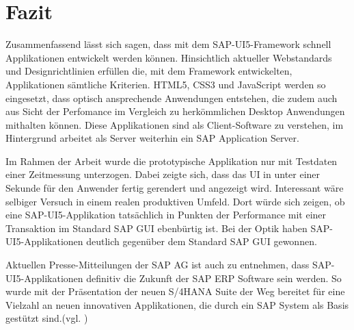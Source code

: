 \section{Fazit}\label{fazit}
Zusammenfassend lässt sich sagen, dass mit dem SAP-UI5-Framework schnell Applikationen entwickelt werden können. Hinsichtlich aktueller Webstandards und Designrichtlinien erfüllen die, mit dem Framework entwickelten, Applikationen sämtliche Kriterien. HTML5, CSS3 und JavaScript werden so eingesetzt, dass optisch ansprechende Anwendungen entstehen, die zudem auch aus Sicht der Perfomance im Vergleich zu herkömmlichen Desktop Anwendungen mithalten können. Diese Applikationen sind als Client-Software zu verstehen, im Hintergrund arbeitet als Server weiterhin ein SAP Application Server.\par Im Rahmen der Arbeit wurde die prototypische Applikation nur mit Testdaten einer Zeitmessung unterzogen. Dabei zeigte sich, dass das UI in unter einer Sekunde für den Anwender fertig gerendert und angezeigt wird. Interessant wäre selbiger Versuch in einem realen produktiven Umfeld. Dort würde sich zeigen, ob eine SAP-UI5-Applikation tatsächlich in Punkten der Performance mit einer Transaktion im Standard SAP GUI ebenbürtig ist. Bei der Optik haben SAP-UI5-Applikationen deutlich gegenüber dem Standard SAP GUI gewonnen.\par Aktuellen Presse-Mitteilungen der SAP AG ist auch zu entnehmen, dass SAP-UI5-Applikationen definitiv die Zukunft der SAP ERP Software sein werden. So wurde mit der Präsentation der neuen S/4HANA Suite der Weg bereitet für eine Vielzahl an neuen innovativen Applikationen, die durch ein SAP System als Basis gestützt sind.(vgl. \cite{cbs4hana})